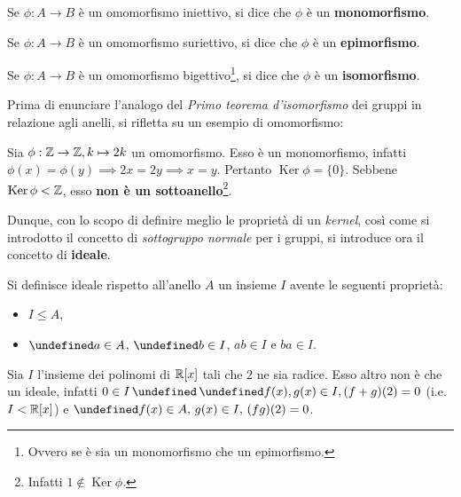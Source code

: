 \documentclass[a4paper]{article}
\DeclareMathOperator{\Ker}{Ker}
\let\oldforall\forall
\let\forall\undefined
\DeclareMathOperator{\forall}{\oldforall}
\let\oldland\land
\let\land\undefined
\DeclareMathOperator{\land}{\oldland}
\begin{document}
\begin{definition}
    Se $\phi : A \to B$ è un omomorfismo iniettivo, si dice che
    $\phi$ è un \textbf{monomorfismo}.
\end{definition}

\begin{definition}
    Se $\phi : A \to B$ è un omomorfismo suriettivo, si dice che
    $\phi$ è un \textbf{epimorfismo}.
\end{definition}

\begin{definition}
    Se $\phi : A \to B$ è un omomorfismo bigettivo\footnote{Ovvero se è sia un monomorfismo che un epimorfismo.}, si dice che
    $\phi$ è un \textbf{isomorfismo}.
\end{definition}

Prima di enunciare l'analogo del \textit{Primo teorema d'isomorfismo} dei gruppi
in relazione agli anelli, si rifletta su un esempio di omomorfismo:

\begin{example}
    Sia $\phi : \mathbb{Z} \to \mathbb{Z}, k \mapsto 2k$ un omomorfismo. Esso è un monomorfismo,
    infatti $\phi(x)=\phi(y) \implies 2x=2y \implies x=y$. Pertanto $\Ker \phi = \{0\}$. Sebbene $\Ker \phi < \ZZ$, esso \textbf{non è un sottoanello}\footnote{Infatti $1 \notin \Ker \phi$.}.
\end{example}

Dunque, con lo scopo di definire meglio le proprietà di un \textit{kernel},
così come si introdotto il concetto di \textit{sottogruppo normale} per i gruppi, si introduce ora il concetto di \textbf{ideale}.

\begin{definition}
    Si definisce ideale rispetto all'anello $A$ un insieme $I$ avente le seguenti proprietà:

    \begin{itemize}
        \item $I \leq A$,
        \item $\forall a \in A$, $\forall b \in I$, $ab \in I$ e $ba \in I$.
    \end{itemize}
\end{definition}

\begin{example}
    \label{exmpl:polinomi}
    Sia $I$ l'insieme dei polinomi di $\mathbb{R}[x]$ tali che $2$ ne sia radice. Esso
    altro non è che un ideale, infatti $0 \in I \,\land\, \forall f(x), g(x) \in I, (f+g)(2)=0$ (i.e. $I<\mathbb{R}[x]$) e $\forall f(x) \in A, \, g(x) \in I, \, (fg)(2) = 0$.
\end{example}
\end{document}
